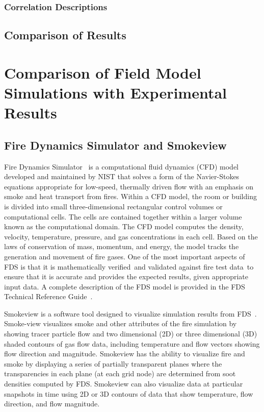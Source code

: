 \documentclass[twoside]{uocthesis}
\begin{document}
{{\subsection{Correlation Descriptions}

\section{Comparison of Results}

\chapter{Comparison of Field Model Simulations with Experimental Results}

\section{Fire Dynamics Simulator and Smokeview}

Fire Dynamics Simulator~\cite{FDS_Users_Guide} is a computational fluid dynamics (CFD) model developed and maintained by NIST that solves a form of the Navier-Stokes equations appropriate for low-speed, thermally driven flow with an emphasis on smoke and heat transport from fires. Within a CFD model, the room or building is divided into small three-dimensional rectangular control volumes or computational cells. The cells are contained together within a larger volume known as the computational domain. The CFD model computes the density, velocity, temperature, pressure, and gas concentrations in each cell. Based on the laws of conservation of mass, momentum, and energy, the model tracks the generation and movement of fire gases. One of the most important aspects of FDS is that it is mathematically verified~\cite{FDS_Verification_Guide}and validated against fire test data~\cite{FDS_Validation_Guide}to ensure that it is accurate and provides the expected results, given appropriate input data. A complete description of the FDS model is provided in the FDS Technical Reference Guide~\cite{FDS_Tech_Guide}.

Smokeview is a software tool designed to visualize simulation results from FDS~\cite{Smokeview_Users_Guide}. Smoke-view visualizes smoke and other attributes of the fire simulation by showing tracer particle flow and two dimensional (2D) or three dimensional (3D) shaded contours of gas flow data, including temperature and flow vectors showing flow direction and magnitude. Smokeview has the ability to visualize fire and smoke by displaying a series of partially transparent planes where the transparencies in each plane (at each grid node) are determined from soot densities computed by FDS. Smokeview can also visualize data at particular snapshots in time using 2D or 3D contours of data that show temperature, flow direction, and flow magnitude.

}}
\end{document}
